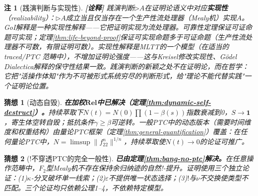 \documentclass[11pt,a4paper]{article}
\newtheorem{conjecture}{猜想}
\newtheorem{remark}{注}
\newcommand{\lvl}[1]{\hfill\textbf{\footnotesize[#1]}}
\newcommand{\lvI}{\lvl{诠释}}
\newcommand{\I}{\mathbf{1}}
\newcommand{\bang}{{!}}
\newcommand{\eps}{\varepsilon}
\begin{document}
\begin{remark}[践演判断与实现性]\lvI
践演判断$\triangleright A$在证明论语义中对应\textbf{实现性}（realizability）：$\triangleright A$成立当且仅当存在一个生产性流处理器（Mealy机）实现$A$。GoI解释是一种实现性解释——它把证明实现为流处理器。可靠性定理保证可证命题可实现；定理\ref{thm:life-beyond-proof}保证可实现命题多于可证命题（生产性流处理器不可数，有限证明可数）。实现性解释是MLTT的一个模型（在适当的 traced/PTC 范畴中），不增加证明论强度——这与Kreisel修改实现性、G\"odel Dialectica解释的保守性结果一致。践演判断的新颖之处不在证明论，而在\emph{哲学}：它把"活操作体知"作为不可被形式系统穷尽的判断形式，给"理论不能代替实践"一个证明论位置。
\end{remark}

\begin{conjecture}[动态自毁]\label{conj:dynamic}
\textbf{在加权$\mathbf{Rel}$中已解决（定理\ref{thm:dynamic-self-destruct}）。}持续萃取下$N(t)=N(0)\prod(1-\beta(s))$指数衰减到0，$S\to\I$，寄生体空转自毁；抵抗条件$\gamma\geq\beta$可逆转。一般PTC中的动态版本（需要时间维度和权重结构）由量论PTC框架（定理\ref{thm:general-quantification}）覆盖：在任何量论PTC中，$N=\limsup\|f_{22}^n\|^{1/n}$，持续萃取使$N(t)\to0$的论证可推广。
\end{conjecture}

\begin{conjecture}[$\bang$不穿透PTC的完全一般性]\label{conj:bang-ptc}
\textbf{已由定理\ref{thm:bang-no-ptc}解决。}在任意操作范畴中，$F_2$型Mealy机不存在保持余归纳迹的自然!-提升。证明使用三个独立论证：(1)$\kappa$-分叉破坏单一线索；(2)$\eps$不提供唯一状态选择；(3)$\bang$与$\nu$不交换使类型不匹配。三个论证均只依赖公理1--4，不依赖特定模型。
\end{conjecture}
\end{document}
